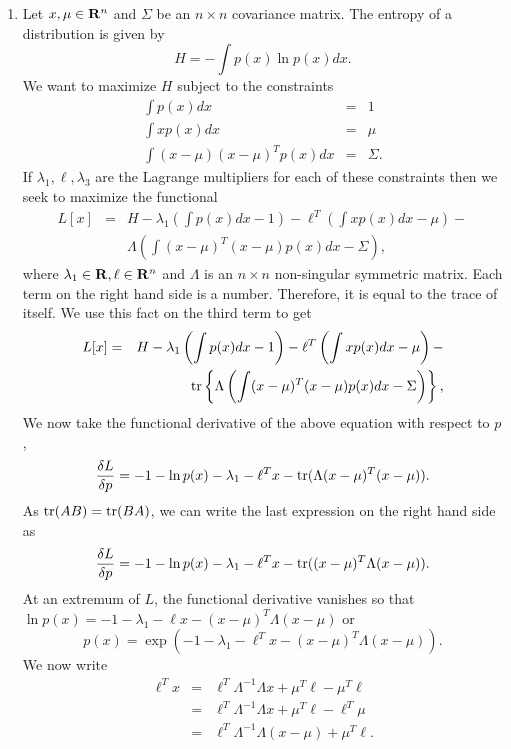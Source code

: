 \begin{enumerate}
\item Let $x, \mu \in \mathbf{R}^n$ and $\Sigma$ be an $n \times n$ covariance matrix. The entropy of a 
distribution is given by
\[
H = -\int p(x)\ln p(x)dx.
\]
We want to maximize $H$ subject to the constraints
\begin{eqnarray}
\int p(x)dx &=& 1 \label{c2pe14} \\
\int xp(x)dx &=& \mu \label{c2pe15} \\
\int (x - \mu)(x - \mu)^Tp(x)dx &=& \Sigma \label{c2pe16} .
\end{eqnarray}
If $\lambda_1, \ell, \lambda_3$ are the Lagrange multipliers for each of these constraints then
we seek to maximize the functional
\begin{eqnarray*}
L[x] &=& H - \lambda_1\left(\int p(x)dx - 1\right) - \ell^T\left(\int xp(x)dx - \mu\right) - \\
 & & \Lambda\left(\int(x-\mu)^T(x-\mu)p(x)dx - \Sigma\right),
\end{eqnarray*}
where $\lambda_1 \in \mathbf{R}, \ell \in \mathbf{R}^n$ and $\Lambda$ is an $n \times n$ non-singular 
symmetric matrix. Each term on the right hand side is a number. Therefore, it is equal to the
trace of itself. We use this fact on the third term to get
\begin{eqnarray*}
L[x] &=& H - \lambda_1\left(\int p(x)dx - 1\right) - \ell^T\left(\int xp(x)dx - \mu\right) - \\
 & & \operatorname{tr}\left\{\Lambda\left(\int(x-\mu)^T(x-\mu)p(x)dx - \Sigma\right)\right\},
\end{eqnarray*}
 We now take the functional derivative of the above equation with respect to $p$,
\[
\frac{\delta L}{\delta p} = -1 - \ln p(x) - \lambda_1 - \ell^T x - \operatorname{tr}(\Lambda (x - \mu)^T(x - \mu)).
\]
As $\operatorname{tr}(AB) = \operatorname{tr}(BA)$, we can write the last expression on the right hand side as
\[
\frac{\delta L}{\delta p} = -1 - \ln p(x) - \lambda_1 - \ell^T x - \operatorname{tr}((x - \mu)^T\Lambda(x - \mu)).
\]
At an extremum of $L$, the functional derivative vanishes so that $\ln p(x) = -1 - \lambda_1 - \ell x
- (x - \mu)^T\Lambda(x - \mu)$ or
\begin{equation}\label{c2pe17}
p(x) = \exp\left(-1 - \lambda_1 - \ell^T x - (x - \mu)^T\Lambda(x - \mu)\right).
\end{equation}
We now write 
\begin{eqnarray*}
\ell^T x &=& \ell^T \Lambda^{-1} \Lambda x + \mu^T\ell - \mu^T\ell \\
 &=&  \ell^T \Lambda^{-1} \Lambda x + \mu^T\ell - \ell^T\mu \\
 &=& \ell^T\Lambda^{-1}\Lambda(x - \mu) + \mu^T\ell.

\end{eqnarray*}
\end{enumerate}
